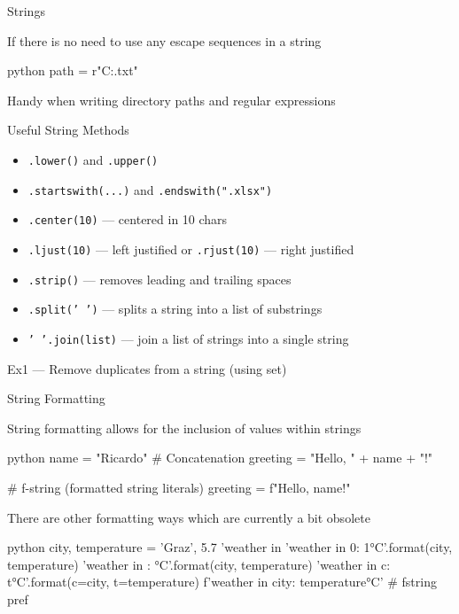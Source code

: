 \documentclass[
	11pt, 
]{beamer}
\begin{document}
\begin{frame}[fragile]{Strings}

If there is no need to use any escape sequences in a string

\begin{mintedbox}{python}
path = r"C:\documents\course\news.txt"
\end{mintedbox}

Handy when writing directory paths and regular expressions

\begin{exampleblock}{Useful String Methods}
    \begin{itemize}
        \item \texttt{.lower()} and \texttt{.upper()}
        \item \texttt{.startswith(...)} and \texttt{.endswith(".xlsx")}
        \item \texttt{.center(10)} --- centered in 10 chars
        \item \texttt{.ljust(10)} --- left justified or \texttt{.rjust(10)} --- right justified
        \item \texttt{.strip()} --- removes leading and trailing spaces
        \item \texttt{.split(' ')} --- splits a string into a list of substrings
        \item \texttt{' '.join(list)} --- join a list of strings into a single string 
    \end{itemize}
\end{exampleblock}

Ex1 --- Remove duplicates from a string (using set)

\end{frame}


\begin{frame}[fragile]{String Formatting}

String formatting allows for the inclusion of values within strings

\begin{mintedbox}{python}
name = "Ricardo"     
# Concatenation
greeting = "Hello, " + name + "!"

# f-string (formatted string literals)
greeting = f"Hello, {name}!"
\end{mintedbox}

There are other formatting ways which are currently a bit obsolete

\begin{mintedbox}{python}
city, temperature = 'Graz', 5.7    
'weather in %
'weather in {0}: {1}°C'.format(city, temperature)
'weather in {}: {}°C'.format(city, temperature)
'weather in {c}: {t}°C'.format(c=city, t=temperature)
f'weather in {city}: {temperature}°C' # fstring pref
\end{mintedbox}

\end{frame}
\end{document}
